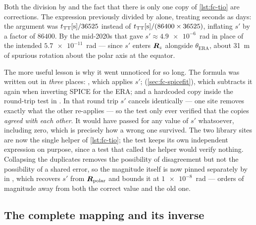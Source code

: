 \begin{lupntnote}
  Both the division by  and the fact that there is only one
  copy of \cref{lst:fc-tio} are corrections. The expression previously divided
  by  alone, treating seconds as days: the argument was
  $t_{\mathrm{TT}}[\si{\second}]/36525$ instead of
  $t_{\mathrm{TT}}[\si{\second}]/(86400\times36525)$, inflating $s'$ by a factor of
  $\num{86400}$. By the mid-2020s that gave $s' \approx \num{4.9e-6}$~rad in
  place of the intended $\num{5.7e-11}$~rad --- since $s'$ enters
  $\bm{R}_z$ alongside $\theta_{\mathrm{ERA}}$, about \SI{31}{\meter} of
  spurious rotation about the polar axis at the equator.

  The more useful lesson is why it went unnoticed for so long. The formula was
  written out in \emph{three} places: , which applies
  $s'$;  (\cref{sec:fc-spicefit}), which subtracts it
  again when inverting SPICE for the ERA; and a hardcoded copy inside the
  round-trip test in . In
  that round trip $s'$ cancels identically --- one site removes exactly what
  the other re-applies --- so the test only ever verified that the copies
  \emph{agreed with each other}. It would have passed for any value of $s'$
  whatsoever, including zero, which is precisely how a wrong one survived.
  The two library sites are now the single helper of \cref{lst:fc-tio}; the
  test keeps its own independent expression on purpose, since a test that
  called the helper would verify nothing. Collapsing the duplicates removes the
  possibility of disagreement but not the possibility of a shared error, so the
  magnitude itself is now pinned separately by
   in
  , which recovers
  $s'$ from $\bm{R}_{\mathrm{polar}}$ and bounds it at
  $\num{1e-8}$~rad --- orders of magnitude away from both the correct value and
  the old one.
\end{lupntnote}

\subsection{The complete mapping and its inverse}

